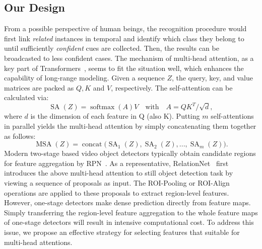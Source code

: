 \documentclass[letterpaper]{article} \usepackage{aaai23}  \usepackage{times}  \usepackage{helvet}  \usepackage{courier}  \usepackage[hyphens]{url}  \usepackage{graphicx} \urlstyle{rm} \def\UrlFont{\rm}  \usepackage{natbib}  \usepackage{caption} \usepackage{xcolor}
\begin{document}
\subsection{Our Design}
From a possible perspective of human beings, the recognition procedure would first link \emph{related} instances in temporal and identify which class they belong to until sufficiently \emph{confident} cues are collected. Then, the results can be broadcasted to less confident cases. The mechanism of multi-head attention, as a key part of Transformers~\cite{vaswani2017attention}, seems to fit the situation well, which enhances the capability of long-range modeling. Given a sequence $Z$, the query, key, and value matrices are packed as $Q, K$ and $V$, respectively. The self-attention can be calculated via:
\begin{equation}
 \operatorname{SA}(Z) =  \operatorname{softmax}\left(A\right)V\quad \text{with} \quad A =QK^{T}/{\sqrt{d}},
\end{equation}
where $d$ is the dimension of each feature in Q (also K).
Putting $m$ self-attentions in parallel yields the multi-head attention by simply concatenating them together as follows:
\begin{equation}
\operatorname{MSA}(Z)=\operatorname{concat}\big(\operatorname{SA}_1(Z),\operatorname{SA}_2(Z),...,\operatorname{SA}_m(Z)\big).
\end{equation}
Modern two-stage based video object detectors typically obtain candidate regions for feature aggregation by RPN~\cite{ren2015faster}. As a representative, RelationNet~\cite{hu2018relation} first introduces the above multi-head attention to still object detection task by viewing a sequence of proposals as input. The ROI-Pooling or ROI-Align operations are applied to these proposals to extract region-level features. However, one-stage detectors make dense prediction directly from feature maps. Simply transferring the region-level feature aggregation to the whole feature maps of one-stage detectors will result in intensive computational cost. To address this issue, we propose an effective strategy for selecting features that suitable for multi-head attentions.
\end{document}
